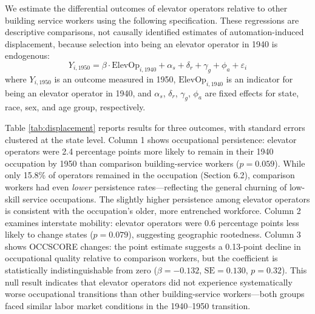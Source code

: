 \documentclass[12pt]{article}
\begin{document}
We estimate the differential outcomes of elevator operators relative to other building service workers using the following specification. These regressions are descriptive comparisons, not causally identified estimates of automation-induced displacement, because selection into being an elevator operator in 1940 is endogenous:
\begin{equation}
    Y_{i,1950} = \beta \cdot \text{ElevOp}_{i,1940} + \alpha_s + \delta_r + \gamma_g + \phi_a + \varepsilon_i
\end{equation}
where $Y_{i,1950}$ is an outcome measured in 1950, $\text{ElevOp}_{i,1940}$ is an indicator for being an elevator operator in 1940, and $\alpha_s$, $\delta_r$, $\gamma_g$, $\phi_a$ are fixed effects for state, race, sex, and age group, respectively.

Table \ref{tab:displacement} reports results for three outcomes, with standard errors clustered at the state level. Column 1 shows occupational persistence: elevator operators were 2.4 percentage points more likely to remain in their 1940 occupation by 1950 than comparison building-service workers ($p = 0.059$). While only 15.8\% of operators remained in the occupation (Section 6.2), comparison workers had even \textit{lower} persistence rates---reflecting the general churning of low-skill service occupations. The slightly higher persistence among elevator operators is consistent with the occupation's older, more entrenched workforce. Column 2 examines interstate mobility: elevator operators were 0.6 percentage points less likely to change states ($p = 0.079$), suggesting geographic rootedness. Column 3 shows OCCSCORE changes: the point estimate suggests a 0.13-point decline in occupational quality relative to comparison workers, but the coefficient is statistically indistinguishable from zero ($\beta = -0.132$, $\text{SE} = 0.130$, $p = 0.32$). This null result indicates that elevator operators did not experience systematically worse occupational transitions than other building-service workers---both groups faced similar labor market conditions in the 1940--1950 transition.
\end{document}
